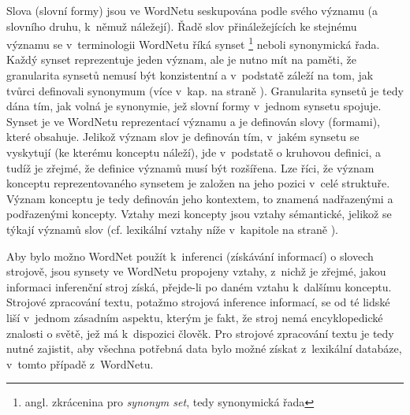 \documentclass[a4paper,11pt,openany,twoside]{book}
\newcommand{\itNameRef}[1]{\textit{\nameref{#1}}}
\begin{document}
					Slova (slovní formy) jsou ve WordNetu seskupována podle svého významu (a slovního druhu, k~němuž náležejí). Řadě slov přináležejících ke stejnému významu se v~terminologii WordNetu říká synset \footnote{angl. zkrácenina pro \textit{synonym set}, tedy synonymická řada} neboli synonymická řada. Každý synset reprezentuje jeden význam, ale je nutno mít na paměti, že granularita synsetů nemusí být konzistentní a v~podstatě záleží na tom, jak tvůrci definovali synonymum (více v~kap. \itNameRef{cha:synon} na straně \pageref{cha:synon}). Granularita synsetů je tedy dána tím, jak volná je synonymie, jež slovní formy v~jednom synsetu spojuje. Synset je ve WordNetu reprezentací významu a je definován slovy (formami), které obsahuje. Jelikož význam slov je definován tím, v~jakém synsetu se vyskytují (ke kterému konceptu náleží), jde v~podstatě o kruhovou definici, a tudíž je zřejmé, že definice významů musí být rozšířena. Lze říci, že význam konceptu reprezentovaného synsetem je založen na jeho pozici v~celé struktuře. Význam konceptu je tedy definován jeho kontextem, to znamená nadřazenými a podřazenými koncepty. \parencite{kamps2002visualizing} Vztahy mezi koncepty jsou vztahy sémantické, jelikož se týkají významů slov (cf. lexikální vztahy níže v~kapitole \itNameRef{cha:lexvztah} na straně \pageref{cha:lexvztah}). 

					Aby bylo možno WordNet použít k~inferenci (získávání informací) o slovech strojově, jsou synsety ve WordNetu propojeny vztahy, z~nichž je zřejmé, jakou informaci inferenční stroj získá, přejde-li po daném vztahu k~dalšímu konceptu. Strojové zpracování textu, potažmo strojová inference informací, se od té lidské liší v~jednom zásadním aspektu, kterým je fakt, že stroj nemá encyklopedické znalosti o světě, jež má k~dispozici člověk. Pro strojové zpracování textu je tedy nutné zajistit, aby všechna potřebná data bylo možné získat z~lexikální databáze, v~tomto případě z~WordNetu.
\end{document}
